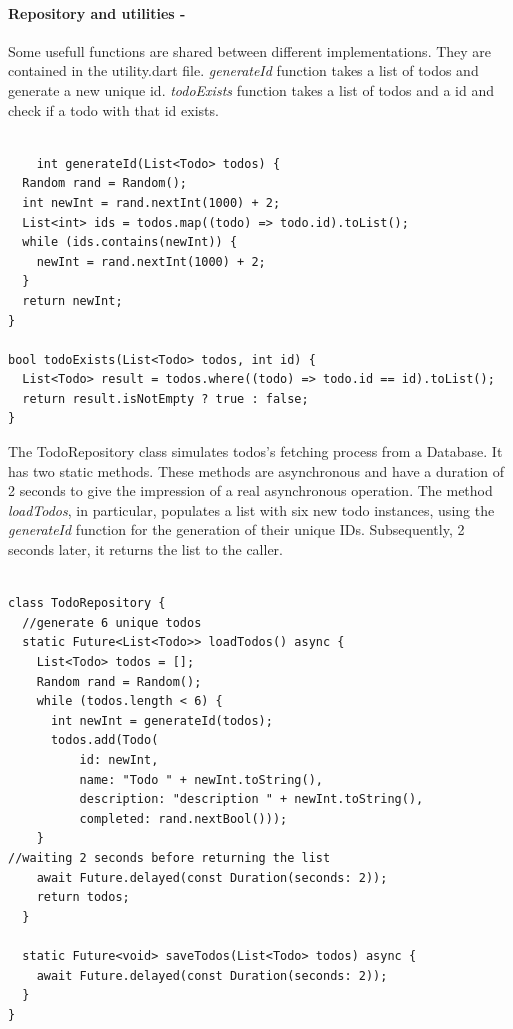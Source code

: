\paragraph{Repository and utilities - }
	\label{par:todo_app_models_and_repository}
Some usefull functions are shared between different implementations. They are contained in the utility.dart file. \textit{generateId} function takes a list of todos and generate a new unique id. \textit{todoExists} function takes a list of todos and a id and check if a todo with that id exists.
\mbox{}\\
\begin{code}
			\label{code:2.5}
	\begin{verbatim}
	
	int generateId(List<Todo> todos) {
  Random rand = Random();
  int newInt = rand.nextInt(1000) + 2;
  List<int> ids = todos.map((todo) => todo.id).toList();
  while (ids.contains(newInt)) {
    newInt = rand.nextInt(1000) + 2;
  }
  return newInt;
}

bool todoExists(List<Todo> todos, int id) {
  List<Todo> result = todos.where((todo) => todo.id == id).toList();
  return result.isNotEmpty ? true : false;
}
	\end{verbatim}
	\end{code}
The TodoRepository class simulates todos's fetching process from a Database. It has two static methods. These methods are asynchronous and have a duration of 2 seconds to give the impression of a real asynchronous operation. The method \textit{loadTodos}, in particular, populates a list with six new todo instances, using the \textit{generateId} function for the generation of their unique IDs. Subsequently, 2 seconds later, it returns the list to the caller.
	\mbox{}\\
	\begin{code}
			\label{code:2.5}
	\begin{verbatim}
	
class TodoRepository {
  //generate 6 unique todos
  static Future<List<Todo>> loadTodos() async {
    List<Todo> todos = [];
    Random rand = Random();
    while (todos.length < 6) {
      int newInt = generateId(todos);
      todos.add(Todo(
          id: newInt,
          name: "Todo " + newInt.toString(),
          description: "description " + newInt.toString(),
          completed: rand.nextBool()));
    }
//waiting 2 seconds before returning the list
    await Future.delayed(const Duration(seconds: 2));
    return todos;
  }

  static Future<void> saveTodos(List<Todo> todos) async {
    await Future.delayed(const Duration(seconds: 2));
  }
}
	\end{verbatim}
	\end{code}
	
